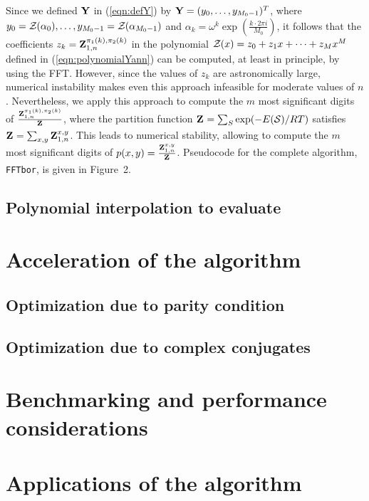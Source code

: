 Since we defined $\bf Y$ in (\ref{eqn:defY}) by ${\bf Y} =
(y_0,\dots,y_{M_0-1})^T$, where
$y_0={\mathcal Z}_{}(\alpha_0),\dots, y_{M_0-1}={\mathcal Z}_{}(\alpha_{M_0-1})$ and $\alpha_k = \omega^k
\exp(\frac{k \cdot 2\pi i}{M_0})$,
it follows that the coefficients
$z_k={\bf Z}^{\pi_1(k),\pi_2(k)}_{1,n}$ in the polynomial
${\mathcal Z}_{}(x) = z_0 + z_1 x + \dots + z_{M} x^{M}$ defined in
(\ref{eqn:polynomialYann}) can be computed, at least in principle,
by using the FFT. However, since the values of
$z_{k}$ are astronomically large, numerical
instability makes even this approach infeasible for moderate values of $n$.
Nevertheless, we apply this approach to compute the $m$ most significant
digits of $\frac{{\bf Z}^{\pi_1(k),\pi_2(k)}_{1,n}}{{\bf Z}^{}_{}}$,
where the partition function ${\bf Z}^{}_{} = \sum_{S} \exp(-E(\mathcal S)/RT)$ satisfies
${{\bf Z}^{}_{}} = \sum_{x,y} {\bf Z}^{x,y}_{1,n}$. This leads to numerical stability,
allowing \ffttwo to compute the
$m$ most significant digits of $p(x,y) = \frac{{\bf Z}^{x,y}_{1,n}}{{\bf Z}^{}_{}}$.
Pseudocode for the complete algorithm, {\tt FFTbor}, is given in
Figure~2.

\subsection{Polynomial interpolation to evaluate
\texorpdfstring{}{}}
\label{subsec:ffttwo:fft}

\section{Acceleration of the \ffttwo algorithm}
\label{sec:ffttwo:perf}

\subsection{Optimization due to parity condition}
\label{subsec:ffttwo:parity}

\subsection{Optimization due to complex conjugates}
\label{subsec:ffttwo:compconj}

\section{Benchmarking and performance considerations}
\label{sec:ffttwo:benchmarking}

\section{Applications of the \ffttwo algorithm}
\label{sec:ffttwo:applications}
